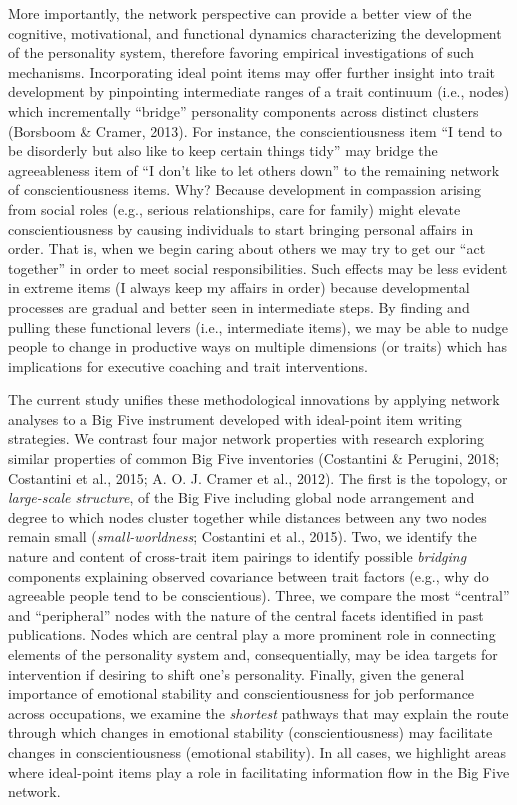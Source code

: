 \documentclass[man]{apa6}
\begin{document}
More importantly, the network perspective can provide a better view of
the cognitive, motivational, and functional dynamics characterizing the
development of the personality system, therefore favoring empirical
investigations of such mechanisms. Incorporating ideal point items may
offer further insight into trait development by pinpointing intermediate
ranges of a trait continuum (i.e., nodes) which incrementally
\enquote{bridge} personality components across distinct clusters
(Borsboom \& Cramer, 2013). For instance, the conscientiousness item
\enquote{I tend to be disorderly but also like to keep certain things
tidy} may bridge the agreeableness item of \enquote{I don't like to let
others down} to the remaining network of conscientiousness items. Why?
Because development in compassion arising from social roles (e.g.,
serious relationships, care for family) might elevate conscientiousness
by causing individuals to start bringing personal affairs in order. That
is, when we begin caring about others we may try to get our \enquote{act
together} in order to meet social responsibilities. Such effects may be
less evident in extreme items (I always keep my affairs in order)
because developmental processes are gradual and better seen in
intermediate steps. By finding and pulling these functional levers
(i.e., intermediate items), we may be able to nudge people to change in
productive ways on multiple dimensions (or traits) which has
implications for executive coaching and trait interventions.

The current study unifies these methodological innovations by applying
network analyses to a Big Five instrument developed with ideal-point
item writing strategies. We contrast four major network properties with
research exploring similar properties of common Big Five inventories
(Costantini \& Perugini, 2018; Costantini et al., 2015; A. O. J. Cramer
et al., 2012). The first is the topology, or \emph{large-scale
structure}, of the Big Five including global node arrangement and degree
to which nodes cluster together while distances between any two nodes
remain small (\emph{small-worldness}; Costantini et al., 2015). Two, we
identify the nature and content of cross-trait item pairings to identify
possible \emph{bridging} components explaining observed covariance
between trait factors (e.g., why do agreeable people tend to be
conscientious). Three, we compare the most \enquote{central} and
\enquote{peripheral} nodes with the nature of the central facets
identified in past publications. Nodes which are central play a more
prominent role in connecting elements of the personality system and,
consequentially, may be idea targets for intervention if desiring to
shift one's personality. Finally, given the general importance of
emotional stability and conscientiousness for job performance across
occupations, we examine the \emph{shortest} pathways that may explain
the route through which changes in emotional stability
(conscientiousness) may facilitate changes in conscientiousness
(emotional stability). In all cases, we highlight areas where
ideal-point items play a role in facilitating information flow in the
Big Five network.
\end{document}
